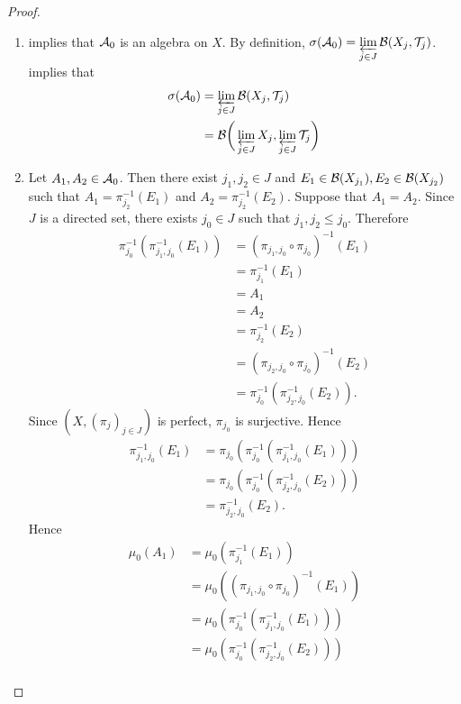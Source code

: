 \documentclass{book}
\begin{document}
	\begin{proof}\
		\begin{enumerate}
			\item {} implies that $\mathcal{A}_0$ is an algebra on $X$. By definition, $\sigma(\mathcal{A}_0) = \varprojlim\limits_{j \in J} \mathcal{B}(X_j, \mathcal{T}_j)$.  implies that
			\begin{align*}
				\sigma(\mathcal{A}_0)
				& = \varprojlim\limits_{j \in J} \mathcal{B}(X_j, \mathcal{T}_j) \\
				& = \mathcal{B}\bigg(\varprojlim\limits_{j \in J} X_j, \varprojlim\limits_{j \in J} \mathcal{T}_j  \bigg)
			\end{align*}
			\item Let $A_1, A_2 \in \mathcal{A}_0$. Then there exist $j_1, j_2 \in J$ and $E_1 \in \mathcal{B}(X_{j_1}) , E_2 \in \mathcal{B}(X_{j_2})$ such that $A_1 = \pi_{j_2}^{-1}(E_1)$ and $A_2 = \pi_{j_2}^{-1}(E_2)$. Suppose that $A_1 = A_2$. Since $J$ is a directed set, there exists $j_0 \in J$ such that $j_1, j_2 \leq j_0$. Therefore 
			\begin{align*}
				\pi_{j_0}^{-1}(\pi_{j_1, j_0}^{-1}(E_1)) 
				& = (\pi_{j_1, j_0} \circ \pi_{j_0})^{-1}(E_1) \\
				& = \pi_{j_1}^{-1}(E_1) \\
				& = A_1 \\
				& = A_2 \\
				& = \pi_{j_2}^{-1}(E_2) \\
				& = (\pi_{j_2, j_0} \circ \pi_{j_0})^{-1}(E_2) \\
				& = \pi_{j_0}^{-1}(\pi_{j_2, j_0}^{-1}(E_2)).
			\end{align*}
			Since $(X, (\pi_j)_{j \in J})$ is perfect, $\pi_{j_0}$ is surjective. Hence 
			\begin{align*}
				\pi_{j_1, j_0}^{-1}(E_1)
				& = \pi_{j_0}(\pi_{j_0}^{-1}(\pi_{j_1, j_0}^{-1}(E_1))) \\
				& = \pi_{j_0}(\pi_{j_0}^{-1}(\pi_{j_2, j_0}^{-1}(E_2))) \\
				& = \pi_{j_2, j_0}^{-1}(E_2).
			\end{align*} 
			Hence 
			\begin{align*}
				\mu_0(A_1)
				& = \mu_0(\pi_{j_1}^{-1}(E_1)) \\
				& = \mu_0((\pi_{j_1, j_0} \circ \pi_{j_0})^{-1}(E_1)) \\
				& = \mu_0(\pi_{j_0}^{-1}(\pi_{j_1, j_0}^{-1}(E_1))) \\
				& = \mu_0(\pi_{j_0}^{-1}(\pi_{j_2, j_0}^{-1}(E_2))) \\

\end{align*}
\end{enumerate}
\end{proof}
\end{document}
